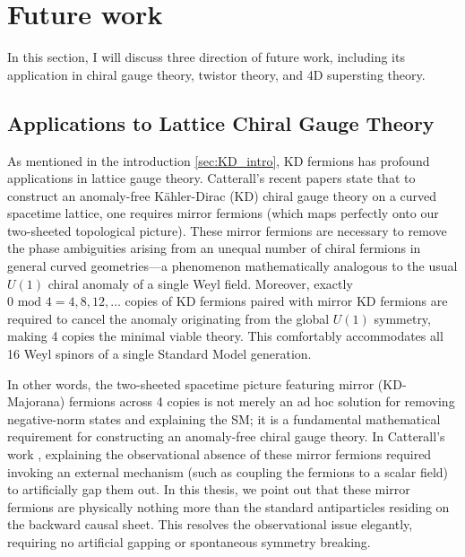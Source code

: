 \section{Future work}

In this section, I will discuss three direction of future work, including its application in chiral gauge theory, twistor theory, and 4D supersting theory.

\subsection{Applications to Lattice Chiral Gauge Theory}

As mentioned in the introduction \cref{sec:KD_intro}, KD fermions has profound applications in lattice gauge theory. Catterall's recent papers \cite{Catterall:2022jky, Catterall:2023nww} state that to construct an anomaly-free Kähler-Dirac (KD) chiral gauge theory on a curved spacetime lattice, one requires mirror fermions (which maps perfectly onto our two-sheeted topological picture). These mirror fermions are necessary to remove the phase ambiguities arising from an unequal number of chiral fermions in general curved geometries—a phenomenon mathematically analogous to the usual $U(1)$ chiral anomaly of a single Weyl field. Moreover, exactly $0\text{ mod }4=4,8,12,\dots$ copies of KD fermions paired with mirror KD fermions are required to cancel the anomaly originating from the global $U(1)$ symmetry, making 4 copies the minimal viable theory. This comfortably accommodates all 16 Weyl spinors of a single Standard Model generation. 

In other words, the two-sheeted spacetime picture featuring mirror (KD-Majorana) fermions across 4 copies is not merely an ad hoc solution for removing negative-norm states and explaining the SM; it is a fundamental mathematical requirement for constructing an anomaly-free chiral gauge theory. In Catterall's work \cite{Catterall:2023nww}, explaining the observational absence of these mirror fermions required invoking an external mechanism (such as coupling the fermions to a scalar field) to artificially gap them out. In this thesis, we point out that these mirror fermions are physically nothing more than the standard antiparticles residing on the backward causal sheet. This resolves the observational issue elegantly, requiring no artificial gapping or spontaneous symmetry breaking.

